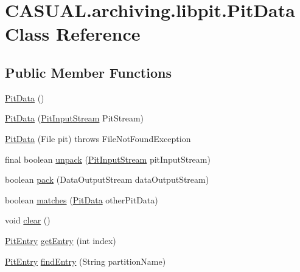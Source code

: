 \hypertarget{classCASUAL_1_1archiving_1_1libpit_1_1PitData}{\section{C\-A\-S\-U\-A\-L.\-archiving.\-libpit.\-Pit\-Data Class Reference}
\label{classCASUAL_1_1archiving_1_1libpit_1_1PitData}
}
\subsection*{Public Member Functions}
\begin{DoxyCompactItemize}
\item 
\hyperlink{classCASUAL_1_1archiving_1_1libpit_1_1PitData_a575807b0b55555f13263cb9e11b0e8f0}{Pit\-Data} ()
\item 
\hyperlink{classCASUAL_1_1archiving_1_1libpit_1_1PitData_a5b8cfb6f9c2f8f3c70f35bfe464ef3d2}{Pit\-Data} (\hyperlink{classCASUAL_1_1archiving_1_1libpit_1_1PitInputStream}{Pit\-Input\-Stream} Pit\-Stream)
\item 
\hyperlink{classCASUAL_1_1archiving_1_1libpit_1_1PitData_a9e4e20dbeacb01785f44e8e17bc38dee}{Pit\-Data} (File pit)  throws File\-Not\-Found\-Exception 
\item 
final boolean \hyperlink{classCASUAL_1_1archiving_1_1libpit_1_1PitData_a5c3639c6e3b5d9a75f105abccb033e20}{unpack} (\hyperlink{classCASUAL_1_1archiving_1_1libpit_1_1PitInputStream}{Pit\-Input\-Stream} pit\-Input\-Stream)
\item 
boolean \hyperlink{classCASUAL_1_1archiving_1_1libpit_1_1PitData_ae1127a2be4d3e84705e23fcc8272d406}{pack} (Data\-Output\-Stream data\-Output\-Stream)
\item 
boolean \hyperlink{classCASUAL_1_1archiving_1_1libpit_1_1PitData_ae1ee835acd4523c6e6d2d87d77dce53c}{matches} (\hyperlink{classCASUAL_1_1archiving_1_1libpit_1_1PitData}{Pit\-Data} other\-Pit\-Data)
\item 
void \hyperlink{classCASUAL_1_1archiving_1_1libpit_1_1PitData_a25d720cdeb7e6b50f2816d1fd4af4784}{clear} ()
\item 
\hyperlink{classCASUAL_1_1archiving_1_1libpit_1_1PitEntry}{Pit\-Entry} \hyperlink{classCASUAL_1_1archiving_1_1libpit_1_1PitData_a74e2d83ff8b0a83e36bebbf96891c37c}{get\-Entry} (int index)
\item 
\hyperlink{classCASUAL_1_1archiving_1_1libpit_1_1PitEntry}{Pit\-Entry} \hyperlink{classCASUAL_1_1archiving_1_1libpit_1_1PitData_ab1a4b23f0380c3e2ce26d85e519bd15a}{find\-Entry} (String partition\-Name)

\end{DoxyCompactItemize}
